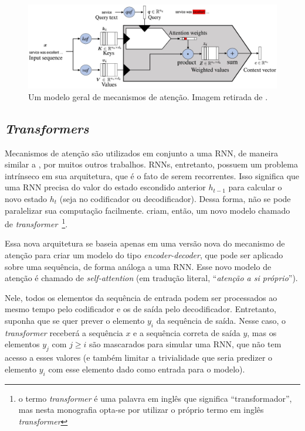 \begin{figure}[h]
\centering
\includegraphics[scale=0.5]{Res/attention-img1.jpg}
\caption{Um modelo geral de mecanismos de atenção. Imagem retirada de
\cite{galassi:2021:attention-in-nlp}.}
\label{attention-img1.jpg}
\end{figure}

\subsection{\textit{Transformers}}%
\label{sub:transformers}

Mecanismos de atenção são utilizados em conjunto a uma RNN, de maneira similar a
\cite{bahdanau-etal:2014:attention-mechanism}, por muitos outros trabalhos.
RNNs, entretanto, possuem um problema intrínseco em sua arquitetura, que é o
fato de serem recorrentes. Isso significa que uma RNN precisa do valor do estado
escondido anterior $h_{t-1}$ para calcular o novo estado $h_t$ (seja no
codificador ou decodificador). Dessa forma, não se pode paralelizar sua
computação facilmente. \cite{vaswani-etal:2017:attention-is-all-you-need} criam,
então, um novo modelo chamado de \textit{transformer}~\footnote{o termo
\textit{transformer} é uma palavra em inglês que significa ``transformador'',
mas nesta monografia opta-se por utilizar o próprio termo em inglês
\textit{transformer}}.

Essa nova arquitetura se baseia apenas em uma versão nova do mecanismo de
atenção para criar um modelo do tipo \textit{encoder-decoder}, que pode ser
aplicado sobre uma sequência, de forma análoga a uma RNN. Esse novo modelo de
atenção é chamado de \textit{self-attention} (em tradução literal,
``\textit{atenção a si próprio}'').

Nele, todos os elementos da sequência de entrada podem ser processados ao mesmo
tempo pelo codificador e os de saída pelo decodificador.  Entretanto, suponha
que se quer prever o elemento $y_i$ da sequência de saída.  Nesse caso, o
\textit{transformer} receberá a sequência $x$ e a sequência correta de saída
$y$, mas os elementos $y_j$ com $j\geq i$ são mascarados para simular uma RNN,
que não tem acesso a esses valores (e também limitar a trivialidade que seria
predizer o elemento $y_i$ com esse elemento dado como entrada para o modelo).

